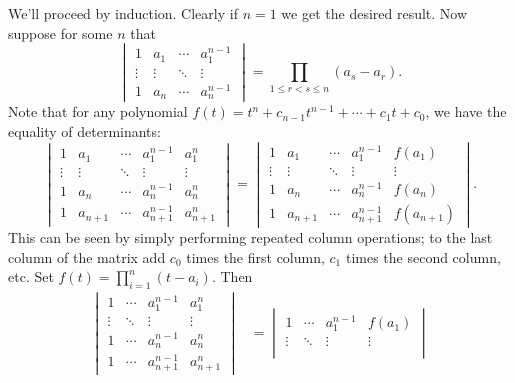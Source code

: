 \documentclass[11pt,letterpaper]{article}
\begin{document}
\begin{solution}
    We'll proceed by induction. Clearly if $n=1$ we get the desired result. Now suppose for some $n$ that
    \[
        \begin{vmatrix}
            1 & a_1 & \cdots & a_1^{n-1}\\
            \vdots & \vdots & \ddots & \vdots\\
            1 & a_n & \cdots & a_n^{n-1}
        \end{vmatrix} = \prod_{1\leq r < s \leq n}(a_s-a_r)
    .\] 
    Note that for any polynomial $f(t)=t^n+c_{n-1}t^{n-1}+\cdots+c_1t+c_0$, we have the equality of determinants:
    \[
        \begin{vmatrix}
            1 & a_1 & \cdots & a_1^{n-1} & a_1^n\\
            \vdots & \vdots & \ddots & \vdots & \vdots\\
            1 & a_n & \cdots & a_n^{n-1} & a_n^n\\
            1 & a_{n+1} & \cdots & a_{n+1}^{n-1} & a_{n+1}^n
        \end{vmatrix} = \begin{vmatrix}
            1 & a_1 & \cdots & a_1^{n-1} & f(a_1)\\
            \vdots & \vdots & \ddots & \vdots & \vdots\\
            1 & a_n & \cdots & a_n^{n-1} & f(a_n)\\
            1 & a_{n+1} & \cdots & a_{n+1}^{n-1} & f(a_{n+1}) 
        \end{vmatrix}
    .\]  
    This can be seen by simply performing repeated column operations; to the last column of the matrix add $c_0$ times the first column, $c_1$ times the second column, etc. Set $f(t)=\prod^n_{i=1} (t-a_i)$. Then
    \[
        \begin{aligned}
            \begin{vmatrix}
                1 &  \cdots & a_1^{n-1} & a_1^n\\
                \vdots  &\ddots & \vdots & \vdots\\
                1  &\cdots & a_n^{n-1} & a_n^n\\
                1  &\cdots & a_{n+1}^{n-1} & a_{n+1}^n
            \end{vmatrix}&=
            \begin{vmatrix}
                1&  \cdots & a_1^{n-1} & f(a_1)\\
                \vdots  &\ddots & \vdots & \vdots\\

\end{vmatrix}
\end{aligned}\]
\end{solution}
\end{document}
